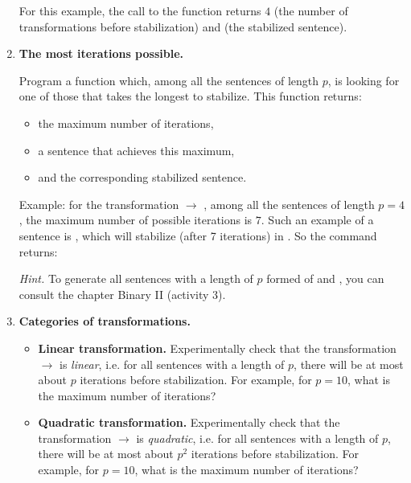 \documentclass[11pt,class=report,crop=false]{standalone}
\begin{document}
\begin{activite}
\begin{enumerate}
For this example, the call to the  function returns $4$ (the number of transformations before stabilization) and  (the stabilized sentence).

	\item \textbf{The most iterations possible.}
	
	Program a function 
which, among all the sentences of length $p$, is looking for one of those that takes the longest to stabilize. This function returns:
\begin{itemize}
  \item the maximum number of iterations,
  \item a sentence that achieves this maximum,
  \item and the corresponding stabilized sentence.
\end{itemize}

Example: for the transformation \rzero\run{} $\rightarrow$ \run\rzero\rzero, among all the sentences of length $p=4$, the maximum number of possible iterations is $7$. Such an example of a sentence is \rzero\run\run\run, which will stabilize (after 7 iterations) in \run\run\run\rzero\rzero\rzero\rzero\rzero\rzero\rzero\rzero.
So the command  returns: 


  \emph{Hint.} To generate all sentences with a length of $p$ formed of \rzero{} and \run{}, you can consult the chapter \og{}Binary II\fg{} (activity 3).

	\item \textbf{Categories of transformations.}
	
	\begin{itemize} 
	\item \textbf{Linear transformation.}
	Experimentally check that the transformation \rzero\rzero\run\run{} $\rightarrow$\run\run\rzero{} is \emph{linear}, i.e. for all sentences with a length of $p$, there will be at most about $p$ iterations before stabilization. For example, for $p=10$, what is the maximum number of iterations?
	
	\item \textbf{Quadratic transformation.}
	Experimentally check that the transformation \rzero\run{} $\rightarrow$\run\rzero{} is \emph{quadratic}, i.e. for all sentences with a length of $p$, there will be at most about $p^2$ iterations before stabilization. For example, for $p=10$, what is the maximum number of iterations?
	

\end{itemize}
\end{enumerate}
\end{activite}
\end{document}
